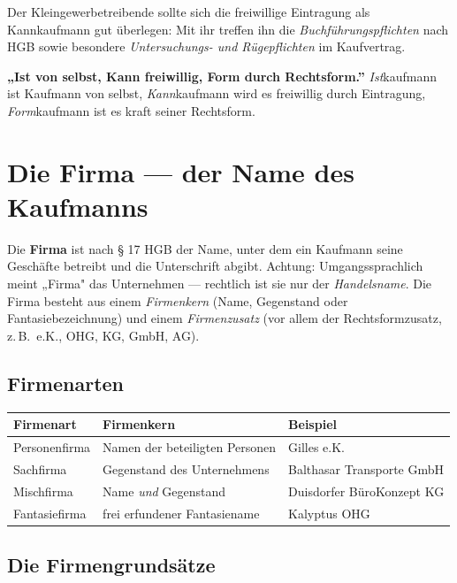 \documentclass[11pt, a4paper]{article}
\begin{document}
\begin{merksatz}
Der Kleingewerbetreibende sollte sich die freiwillige Eintragung als Kannkaufmann gut
überlegen: Mit ihr treffen ihn die \emph{Buchführungspflichten} nach HGB sowie besondere
\emph{Untersuchungs- und Rügepflichten} im Kaufvertrag.
\end{merksatz}

\begin{eselsbruecke}
\textbf{„Ist von selbst, Kann freiwillig, Form durch Rechtsform.”} \emph{Ist}kaufmann ist
Kaufmann von selbst, \emph{Kann}kaufmann wird es freiwillig durch Eintragung, \emph{Form}\-kaufmann
ist es kraft seiner Rechtsform.
\end{eselsbruecke}

\section{Die Firma --- der Name des Kaufmanns}

Die \textbf{Firma} ist nach § 17 HGB der Name, unter dem ein Kaufmann seine Geschäfte
betreibt und die Unterschrift abgibt. Achtung: Umgangssprachlich meint „Firma" das
Unternehmen --- rechtlich ist sie nur der \emph{Handelsname}. Die Firma besteht aus einem
\emph{Firmenkern} (Name, Gegenstand oder Fantasiebezeichnung) und einem \emph{Firmenzusatz}
(vor allem der Rechtsformzusatz, z.\,B.\ e.K., OHG, KG, GmbH, AG).

\subsection{Firmenarten}

\begin{center}
\begin{tabular}{p{3.1cm} p{7.2cm} p{2.6cm}}
\toprule
\textbf{Firmenart} & \textbf{Firmenkern} & \textbf{Beispiel}\\
\midrule
Personenfirma & Namen der beteiligten Personen & Gilles e.K.\\
Sachfirma & Gegenstand des Unternehmens & Balthasar Transporte GmbH\\
Mischfirma & Name \emph{und} Gegenstand & Duisdorfer BüroKonzept KG\\
Fantasiefirma & frei erfundener Fantasiename & Kalyptus OHG\\
\bottomrule
\end{tabular}
\end{center}

\subsection{Die Firmengrundsätze}
\end{document}
